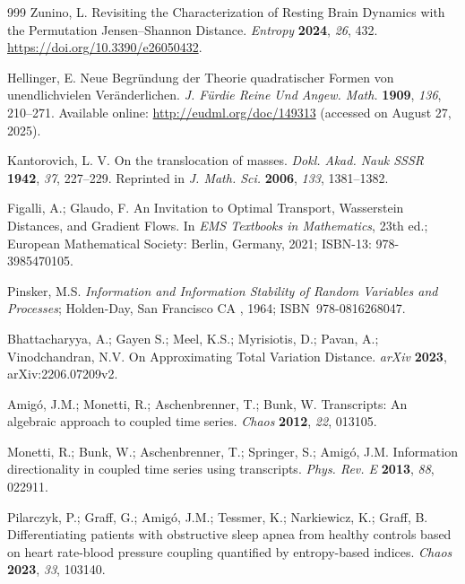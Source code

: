 \documentclass{article}
\begin{document}
\begin{thebibliography}{999}
 Zunino, L. Revisiting the Characterization of Resting
Brain Dynamics with the Permutation Jensen--Shannon Distance. \emph{Entropy} \textbf{2024}, \emph{26}, 432. \url{https://doi.org/10.3390/e26050432}.

 Hellinger, E. Neue Begr\"{u}ndung der Theorie
quadratischer Formen von unendlichvielen Ver\"{a}nderlichen. \emph{J. F\"{u}rdie Reine Und Angew. Math.} \textbf{1909}, \emph{136}, 210--271.  Available online:  
\url{http://eudml.org/doc/149313} (accessed on August 27, 2025). %


 Kantorovich, L. V. On the translocation of masses.
\emph{Dokl. Akad. Nauk SSSR} \textbf{1942}, \emph{37}, 227--229. Reprinted in \emph{J.   Math. Sci.} \textbf{2006}, \emph{133}, 1381--1382.

 Figalli, A.; Glaudo, F. An Invitation to Optimal
Transport, Wasserstein Distances, and Gradient Flows. In \emph{EMS Textbooks in
Mathematics}, 23th ed.; European Mathematical Society: Berlin, Germany, %
 2021; ISBN-13:
978-3985470105.

 Pinsker, M.S. \emph{Information and Information Stability
of Random Variables and Processes}; Holden-Day, San Francisco CA%
, 1964; \mbox{ISBN 978-0816268047.}

 Bhattacharyya, A.; Gayen S.; Meel, K.S.;
Myrisiotis, D.; Pavan, A.; Vinodchandran, N.V. On Approximating Total
Variation Distance. \emph{arXiv} \textbf{2023}, arXiv:2206.07209v2.

 Amig\'{o}, J.M.; Monetti, R.; Aschenbrenner, T.; Bunk,
W. Transcripts: An algebraic approach to coupled time series.  \emph{Chaos} \textbf{2012}, \emph{22}, 013105.

 Monetti, R.; Bunk, W.; Aschenbrenner, T.; Springer,
S.; Amig\'{o}, J.M. Information directionality in coupled time series using
transcripts. \emph{Phys. Rev. E} \textbf{2013}, \emph{88}, 022911.

 Pilarczyk, P.; Graff, G.; Amig\'{o}, J.M.; Tessmer,
K.; Narkiewicz, K.; Graff, B. Differentiating patients with obstructive
sleep apnea from healthy controls based on heart rate-blood pressure
coupling quantified by entropy-based indices. \emph{Chaos} \textbf{2023}, \emph{33}, 103140.


\end{thebibliography}
\end{document}

